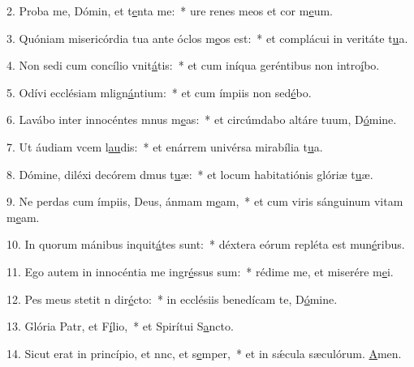 2. Proba me, Dómin, et t\uline{e}nta me:~* ure renes meos et cor m\uline{e}um.\par 
3. Quóniam misericórdia tua ante óclos m\uline{e}os est:~* et complácui in veritáte t\uline{u}a.\par 
4. Non sedi cum concílio vnit\uline{á}tis:~* et cum iníqua geréntibus non intro\uline{í}bo.\par 
5. Odívi ecclésiam mlign\uline{á}ntium:~* et cum ímpiis non sed\uline{é}bo.\par 
6. Lavábo inter innocéntes mnus m\uline{e}as:~* et circúmdabo altáre tuum, D\uline{ó}mine.\par 
7. Ut áudiam vcem l\uline{au}dis:~* et enárrem univérsa mirabília t\uline{u}a.\par 
8. Dómine, diléxi decórem dmus t\uline{u}æ:~* et locum habitatiónis glóriæ t\uline{u}æ.\par 
9. Ne perdas cum ímpiis, Deus, ánmam m\uline{e}am,~* et cum viris sánguinum vitam m\uline{e}am.\par 
10. In quorum mánibus inquit\uline{á}tes sunt:~* déxtera eórum repléta est mun\uline{é}ribus.\par 
11. Ego autem in innocéntia me ingr\uline{é}ssus sum:~* rédime me, et miserére m\uline{e}i.\par 
12. Pes meus stetit n dir\uline{é}cto:~* in ecclésiis benedícam te, D\uline{ó}mine.\par 
13. Glória Patr, et F\uline{í}lio,~* et Spirítui S\uline{a}ncto.\par 
14. Sicut erat in princípio, et nnc, et s\uline{e}mper,~* et in sǽcula sæculórum. \uline{A}men.\par 
